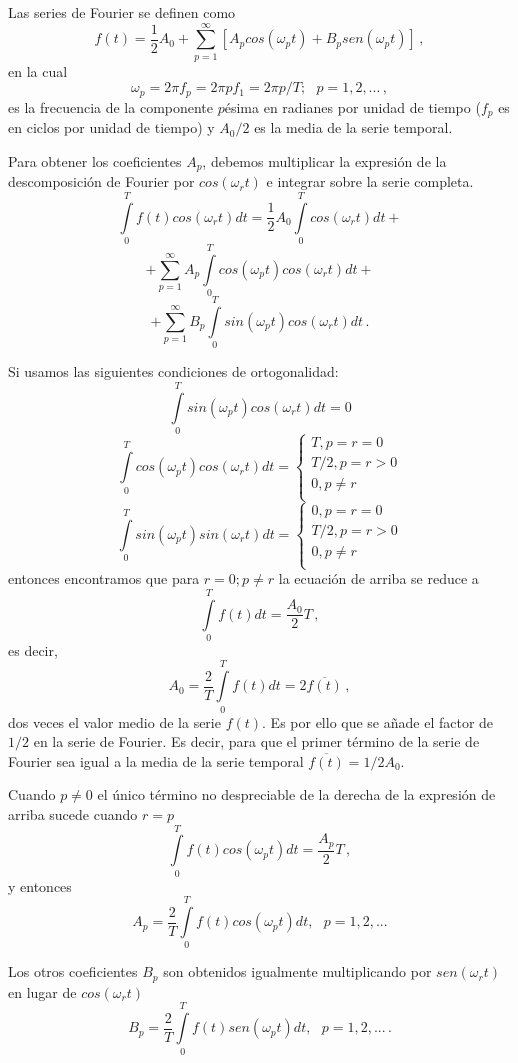 \documentclass[
]{agujournal2019}
\begin{document}
Las series de Fourier se definen como
\[f(t)=\frac{1}{2}A_0 +\sum\limits^\infty_{p=1}[A_p cos(\omega_p t) + B_p sen(\omega_p t)]\,,\]
en la cual
\[\omega_p=2\pi f_p=2\pi p f_1=2\pi p /T;\,\,\,\,p=1,2,...\,,\] es la
frecuencia de la componente \(p\)ésima en radianes por unidad de tiempo
(\(f_p\) es en ciclos por unidad de tiempo) y \(A_0/2\) es la media de
la serie temporal.

Para obtener los coeficientes \(A_p\), debemos multiplicar la expresión
de la descomposición de Fourier por \(cos(\omega_r t)\) e integrar sobre
la serie completa.
\[\int\limits^{T}_{0}f(t)cos(\omega_r t)dt=\frac{1}{2}A_0\int\limits^{T}_{0} cos(\omega_r t) dt + \]
\[+\sum\limits^\infty_{p=1} A_p \int\limits^{T}_{0}cos(\omega_p t)cos(\omega_r t) dt +\]
\[+\sum\limits^\infty_{p=1} B_p \int\limits^{T}_{0}sin(\omega_p t)cos(\omega_r t) dt\,.\]

Si usamos las siguientes condiciones de ortogonalidad:
\[\int\limits^{T}_{0}sin(\omega_p t)cos(\omega_r t) dt=0\]
\[\int\limits^{T}_{0}cos(\omega_p t)cos(\omega_r t) dt=
 \left\lbrace
  \begin{array}{l}
     T, p=r=0 \\
     T/2,p=r>0 \\
     0, p\ne r \\
  \end{array}
  \right.\] \[\int\limits^{T}_{0}sin(\omega_p t)sin(\omega_r t) dt=
 \left\lbrace
  \begin{array}{l}
     0, p=r=0 \\
     T/2,p=r>0 \\
     0, p\ne r \\
  \end{array}
  \right.\] entonces encontramos que para \(r=0;p\ne r\) la ecuación de
arriba se reduce a \[\int\limits^{T}_{0}f(t)dt=\frac{A_0}{2}T\,,\] es
decir, \[A_0=\frac{2}{T}\int\limits^{T}_{0}f(t)dt=2\overline{f(t)}\,,\]
dos veces el valor medio de la serie \(f(t)\). Es por ello que se añade
el factor de \(1/2\) en la serie de Fourier. Es decir, para que el
primer término de la serie de Fourier sea igual a la media de la serie
temporal \(\overline{f(t)}=1/2A_0\).

Cuando \(p\ne0\) el único término no despreciable de la derecha de la
expresión de arriba sucede cuando \(r=p\)
\[\int\limits^{T}_{0}f(t)cos(\omega_p t)dt=\frac{A_p}{2}T\,,\] y
entonces
\[A_p=\frac{2}{T}\int\limits_0^{T} f(t) cos(\omega_p t) dt,\,\,\,\,p=1,2,...\]

Los otros coeficientes \(B_p\) son obtenidos igualmente multiplicando
por \(sen(\omega_r t)\) en lugar de \(cos(\omega_r t)\)
\[B_p=\frac{2}{T}\int\limits_0^{T} f(t) sen(\omega_p t) dt,\,\,\,\,p=1,2,...\,.\]
\end{document}
